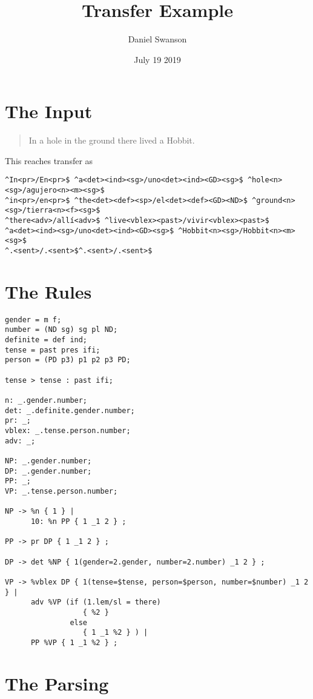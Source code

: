 \documentclass{article}
\title{Transfer Example}
\author{Daniel Swanson}
\date{July 19 2019}
\begin{document}
\maketitle

\section{The Input}

\begin{quote}
    In a hole in the ground there lived a Hobbit.
\end{quote}

This reaches transfer as

\begin{verbatim}
^In<pr>/En<pr>$ ^a<det><ind><sg>/uno<det><ind><GD><sg>$ ^hole<n><sg>/agujero<n><m><sg>$
^in<pr>/en<pr>$ ^the<det><def><sp>/el<det><def><GD><ND>$ ^ground<n><sg>/tierra<n><f><sg>$
^there<adv>/allí<adv>$ ^live<vblex><past>/vivir<vblex><past>$ 
^a<det><ind><sg>/uno<det><ind><GD><sg>$ ^Hobbit<n><sg>/Hobbit<n><m><sg>$
^.<sent>/.<sent>$^.<sent>/.<sent>$
\end{verbatim}

\clearpage
\section{The Rules}

\begin{verbatim}
gender = m f;
number = (ND sg) sg pl ND;
definite = def ind;
tense = past pres ifi;
person = (PD p3) p1 p2 p3 PD;

tense > tense : past ifi;

n: _.gender.number;
det: _.definite.gender.number;
pr: _;
vblex: _.tense.person.number;
adv: _;

NP: _.gender.number;
DP: _.gender.number;
PP: _;
VP: _.tense.person.number;

NP -> %n { 1 } |
      10: %n PP { 1 _1 2 } ;

PP -> pr DP { 1 _1 2 } ;

DP -> det %NP { 1(gender=2.gender, number=2.number) _1 2 } ;

VP -> %vblex DP { 1(tense=$tense, person=$person, number=$number) _1 2 } |
      adv %VP (if (1.lem/sl = there) 
                  { %2 }
               else
                  { 1 _1 %2 } ) |
      PP %VP { 1 _1 %2 } ;
\end{verbatim}

\clearpage
\section{The Parsing}
\end{document}

